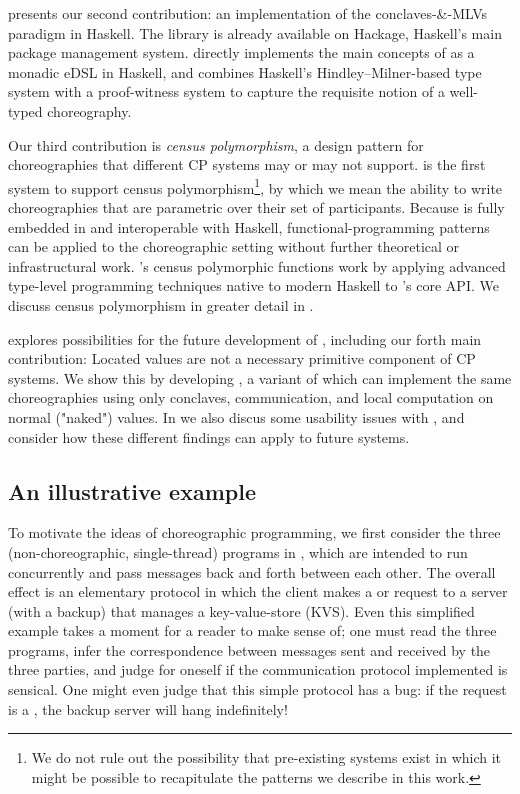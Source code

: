  presents our second contribution: an implementation of the conclaves-\&-MLVs paradigm in Haskell.
The \MultiChor library is already available on Hackage, Haskell's main package management system.
\MultiChor directly implements the main concepts of \HLSCentral as a monadic eDSL in Haskell,
and combines Haskell's Hindley–Milner-based type system with a proof-witness system
to capture the requisite notion of a well-typed choreography.

Our third contribution is \emph{census polymorphism},
a design pattern for choreographies that different CP systems may or may not support.
\MultiChor is the first system to support census polymorphism\footnote{
	We do not rule out the possibility that pre-existing systems exist
	in which it might be possible to recapitulate the patterns we describe in this work.
},
by which we mean the ability to write choreographies
that are parametric over their set of participants.
Because \MultiChor is fully embedded in and interoperable with Haskell,
functional-programming patterns can be applied to the choreographic setting without further theoretical or infrastructural work.
\MultiChor's census polymorphic functions work by applying advanced type-level programming techniques native to modern Haskell
to \MultiChor's core API.
We discuss census polymorphism in greater detail in .

 explores possibilities for the future development of \MultiChor,
including our forth main contribution:
Located values are not a necessary primitive component of CP systems.
We show this
by developing \minichor,
a variant of \MultiChor which can implement the same choreographies using only conclaves, communication, and local computation on normal ("naked") values.
In  we also discus some usability issues with \MultiChor,
and consider how these different findings can apply to future systems.

\subsection{An illustrative example}
To motivate the ideas of choreographic programming,
we first consider the three (non-choreographic, single-thread) programs in ,
which are intended to run concurrently and pass messages back and forth between each other.
The overall effect is an elementary protocol in which the client makes a  or  request to
a server (with a backup) that manages a key-value-store (KVS).
Even this simplified example takes a moment for a reader to make sense of;
one must read the three programs, infer the correspondence between messages sent and received by the three parties,
and judge for oneself if the communication protocol implemented is sensical.
One might even judge that this simple protocol has a bug:
if the request is a , the backup server will hang indefinitely!

